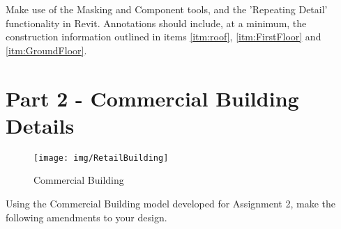 Make use of the Masking and Component tools, and the 'Repeating Detail' functionality in Revit.  Annotations should include, at a minimum, the construction information outlined in items \ref{itm:roof}, \ref{itm:FirstFloor} and \ref{itm:GroundFloor}. 






\newpage

\section*{Part 2 - Commercial Building Details}

\begin{figure}
	\centering
	\texttt{[image: img/RetailBuilding]}
	\caption{Commercial Building}
	\label{fig:retailbuilding}
\end{figure}



Using the Commercial Building model developed for Assignment 2, make the following amendments to your design. 

